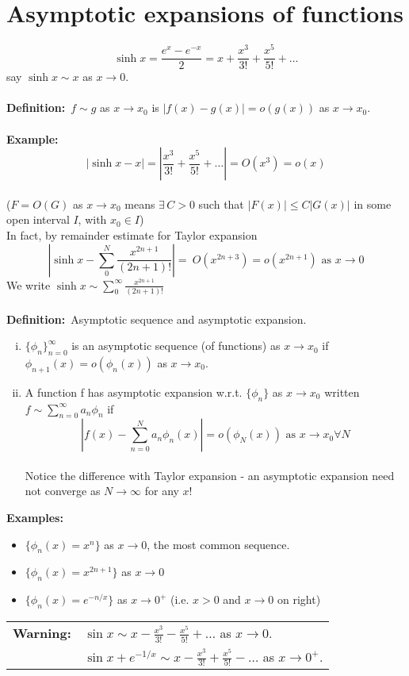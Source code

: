 \documentclass{article}
\newcommand{\definition}{\textbf{Definition:}}
\newcommand{\example}{\textbf{Example:}}
\newcommand{\examples}{\textbf{Examples:}}
\begin{document}
\section{Asymptotic expansions of functions}
\[ \sinh x = \frac{e^x - e^{-x}}{2} = x + \frac{x^3}{3!} + \frac{x^5}{5!} + \dots\]
say $\sinh x \sim x$ as $x \to 0$.
\\
\\
\definition\ $f \sim g$ as $x \to x_0$ is $|f(x) - g(x)| = o(g(x))$ as $x \to x_0$.
\\
\\
\example 
\[|\sinh x - x| = |\frac{x^3}{3!} + \frac{x^5}{5!} + \dots| = O(x^3) = o(x)\]
\\
($F=O(G)$ as $x \to x_0$ means $\exists \, C>0$ such that $|F(x)| \leq C|G(x)|$ in
some open interval $I$, with $x_0 \in I$)
\\
In fact, by remainder estimate for Taylor expansion
\[ \left| \sinh x - \sum_{0}^{N} \frac{x^{2n+1}}{(2n+1)!} \right| = \
O(x^{2n+3}) = o(x^{2n+1}) \mbox{ as } x \to 0\]
We write $\displaystyle \sinh x \sim \sum_{0}^{\infty} \frac{x^{2n+1}}{(2n+1)!}$
\\
\\
\definition\ Asymptotic sequence and asymptotic expansion.
\begin{enumerate}[(i)]
\item $\{\phi_n\}_{n=0}^{\infty}$ is an asymptotic sequence (of functions) as 
		$x \to x_0$ if $\phi_{n+1}(x) = o(\phi_n(x))$ as $x \to x_0$. 
\item A function f has asymptotic expansion w.r.t. $\{ \phi_n\}$ as $x \to x_0$ 
		written $f \sim \sum_{n=0}^{\infty} a_n \phi_n$ if 
		\[ \left| f(x) - \sum_{n=0}^N a_n \phi_n(x) \right| = o(\phi_N(x)) \mbox{ as }
		 x \to x_0 \forall N\]
		\\
		Notice the difference with Taylor expansion - an asymptotic expansion 
		need not converge as $N\to \infty$ for any $x$!
\end{enumerate}
\examples\ 
\begin{itemize}
\item $\{ \phi_n(x) = x^n \}$ as $x \to 0$, the most common sequence.
\item $\{ \phi_n(x) = x^{2n+1} \}$ as $x \to 0$
\item $\{ \phi_n(x) = e^{-n/x} \}$ as $x \to 0^+$ (i.e. $x>0$ and $x\to 0$ on right)
\end{itemize}
%
%
\begin{framed}
\noindent \begin{tabular}{cl} 
\textbf{Warning:} & $\displaystyle \sin x \sim x - \frac{x^3}{3!} -
\frac{x^5}{5!} + \dots$ as $x \to 0$. \\
& $\displaystyle \sin x + e^{-1/x} \sim x  - \frac{x^3}{3!} + \frac{x^5}{5!}
 - \dots$ as $x \to 0^{+}$. 
\end{tabular}
\end{framed}
\end{document}

